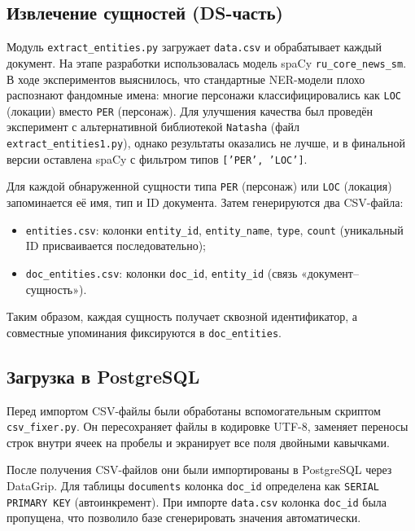 \subsection{Извлечение сущностей (DS-часть)}

Модуль \texttt{extract\_entities.py} загружает \texttt{data.csv} и обрабатывает каждый документ. На этапе разработки использовалась модель spaCy \texttt{ru\_core\_news\_sm}. В ходе экспериментов выяснилось, что стандартные NER-модели плохо распознают фандомные имена: многие персонажи классифицировались как \texttt{LOC} (локации) вместо \texttt{PER} (персонаж). Для улучшения качества был проведён эксперимент с альтернативной библиотекой \texttt{Natasha} (файл \texttt{extract\_entities1.py}), однако результаты оказались не лучше, и в финальной версии оставлена spaCy с фильтром типов \texttt{['PER', 'LOC']}.

Для каждой обнаруженной сущности типа \texttt{PER} (персонаж) или \texttt{LOC} (локация) запоминается её имя, тип и ID документа. Затем генерируются два CSV-файла:
\begin{itemize}
    \item \texttt{entities.csv}: колонки \texttt{entity\_id}, \texttt{entity\_name}, \texttt{type}, \texttt{count} (уникальный ID присваивается последовательно);
    \item \texttt{doc\_entities.csv}: колонки \texttt{doc\_id}, \texttt{entity\_id} (связь «документ–сущность»).
\end{itemize}
Таким образом, каждая сущность получает сквозной идентификатор, а совместные упоминания фиксируются в \texttt{doc\_entities}.

\subsection{Загрузка в PostgreSQL}

Перед импортом CSV-файлы были обработаны вспомогательным скриптом \texttt{csv\_fixer.py}. Он пересохраняет файлы в кодировке UTF-8, заменяет переносы строк внутри ячеек на пробелы и экранирует все поля двойными кавычками.

После получения CSV-файлов они были импортированы в PostgreSQL через DataGrip. Для таблицы \texttt{documents} колонка \texttt{doc\_id} определена как \texttt{SERIAL PRIMARY KEY} (автоинкремент). При импорте \texttt{data.csv} колонка \texttt{doc\_id} была пропущена, что позволило базе сгенерировать значения автоматически. \\

